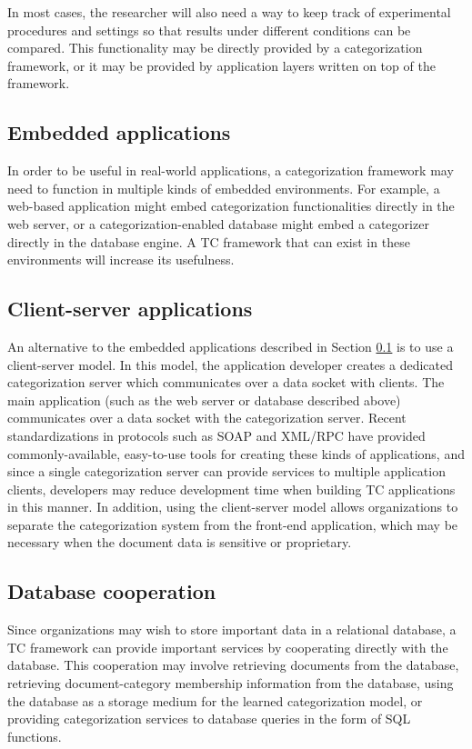 In most cases, the researcher will also need a way to keep track of
experimental procedures and settings so that results under different
conditions can be compared.  This functionality may be directly
provided by a categorization framework, or it may be provided by
application layers written on top of the framework.


\subsection{Embedded applications}
\label{embedded-apps}

In order to be useful in real-world applications, a categorization
framework may need to function in multiple kinds of embedded
environments.  For example, a web-based application might embed
categorization functionalities directly in the web server, or a
categorization-enabled database might embed a categorizer directly in
the database engine.  A TC framework that can exist in these
environments will increase its usefulness.

\subsection{Client-server applications}

An alternative to the embedded applications described in Section
\ref{embedded-apps} is to use a client-server model.  In this model,
the application developer creates a dedicated categorization server
which communicates over a data socket with clients.  The main
application (such as the web server or database described above)
communicates over a data socket with the categorization server.
Recent standardizations in protocols such as SOAP \cite{soap} and XML/RPC
\cite{xmlrpc} have provided commonly-available, easy-to-use tools
for creating these kinds of applications, and since a single
categorization server can provide services to multiple application
clients, developers may reduce development time when building TC
applications in this manner.  In addition, using the client-server
model allows organizations to separate the categorization system from
the front-end application, which may be necessary when the document
data is sensitive or proprietary.

\subsection{Database cooperation}

Since organizations may wish to store important data in a relational
database, a TC framework can provide important services by cooperating
directly with the database.  This cooperation may involve retrieving
documents from the database, retrieving document-category membership
information from the database, using the database as a storage medium
for the learned categorization model, or providing categorization
services to database queries in the form of SQL functions.

